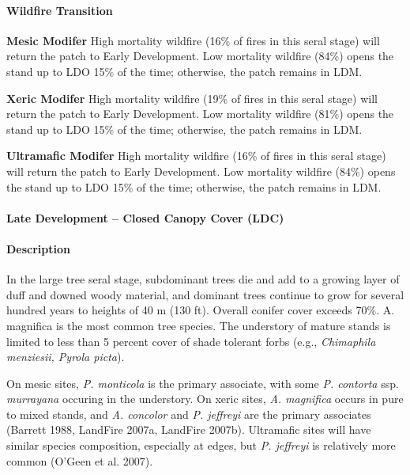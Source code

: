 \paragraph{Wildfire Transition}
\begin{adjustwidth}{2cm}{}
\textbf{Mesic Modifer } High mortality wildfire (16\% of fires in this seral stage) will return the patch to Early Development. Low mortality wildfire (84\%) opens the stand up to LDO 15\% of the time; otherwise, the patch remains in LDM. 

\textbf{Xeric Modifer} High mortality wildfire (19\% of fires in this seral stage) will return the patch to Early Development. Low mortality wildfire (81\%) opens the stand up to LDO 15\% of the time; otherwise, the patch remains in LDM. 

\textbf{Ultramafic Modifer} High mortality wildfire (16\% of fires in this seral stage) will return the patch to Early Development. Low mortality wildfire (84\%) opens the stand up to LDO 15\% of the time; otherwise, the patch remains in LDM.

\end{adjustwidth}

\noindent\hrulefill

\paragraph{Late Development – Closed Canopy Cover (LDC)}

\paragraph{Description} In the large tree seral stage, subdominant trees die and add to a growing layer of duff and downed woody material, and dominant trees continue to grow for several hundred years to heights of 40 m (130 ft). Overall conifer cover exceeds 70\%. A. magnifica is the most common tree species. The understory of mature stands is limited to less than 5 percent cover of shade tolerant forbs (e.g., \emph{Chimaphila menziesii, Pyrola picta}). 

On mesic sites, \emph{P. monticola} is the primary associate, with some \emph{P. contorta} ssp. \emph{murrayana} occuring in the understory. On xeric sites, \emph{A. magnifica} occurs in pure to mixed stands, and \emph{A. concolor} and \emph{P. jeffreyi} are the primary associates (Barrett 1988, LandFire 2007a, LandFire 2007b). Ultramafic sites will have similar species composition, especially at edges, but \emph{P. jeffreyi} is relatively more common (O’Geen et al. 2007).


